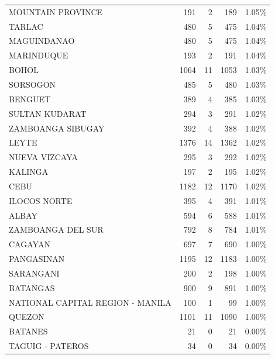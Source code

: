 \begin{tabular}{lrrrr}
MOUNTAIN PROVINCE & 191 & 2 & 189 & 1.05\% \\
TARLAC & 480 & 5 & 475 & 1.04\% \\
MAGUINDANAO & 480 & 5 & 475 & 1.04\% \\
MARINDUQUE & 193 & 2 & 191 & 1.04\% \\
BOHOL & 1064 & 11 & 1053 & 1.03\% \\
SORSOGON & 485 & 5 & 480 & 1.03\% \\
BENGUET & 389 & 4 & 385 & 1.03\% \\
SULTAN KUDARAT & 294 & 3 & 291 & 1.02\% \\
ZAMBOANGA SIBUGAY & 392 & 4 & 388 & 1.02\% \\
LEYTE & 1376 & 14 & 1362 & 1.02\% \\
NUEVA VIZCAYA & 295 & 3 & 292 & 1.02\% \\
KALINGA & 197 & 2 & 195 & 1.02\% \\
CEBU & 1182 & 12 & 1170 & 1.02\% \\
ILOCOS NORTE & 395 & 4 & 391 & 1.01\% \\
ALBAY & 594 & 6 & 588 & 1.01\% \\
ZAMBOANGA DEL SUR & 792 & 8 & 784 & 1.01\% \\
CAGAYAN & 697 & 7 & 690 & 1.00\% \\
PANGASINAN & 1195 & 12 & 1183 & 1.00\% \\
SARANGANI & 200 & 2 & 198 & 1.00\% \\
BATANGAS & 900 & 9 & 891 & 1.00\% \\
NATIONAL CAPITAL REGION - MANILA & 100 & 1 & 99 & 1.00\% \\
QUEZON & 1101 & 11 & 1090 & 1.00\% \\
BATANES & 21 & 0 & 21 & 0.00\% \\
TAGUIG - PATEROS & 34 & 0 & 34 & 0.00\% \\
\bottomrule
\end{tabular}
